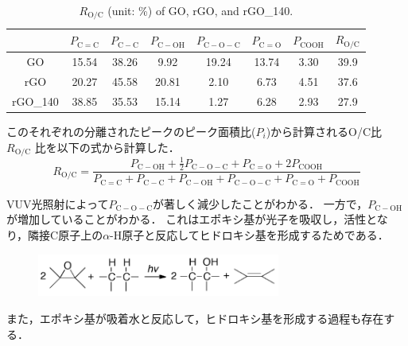 \documentclass[platex,dvipdfmx]{jlreq}			%
\begin{document}
\begin{table}[H]
    \centering
    \caption{$R_{\mathrm{O/C}}$ (unit: \%) of GO, rGO, and rGO\_140.}
    \label{tab:hogehoge}
    \begin{tabular}{|c|c|c|c|c|c|c|c|}
        \hline
        ~        & $P_{\mathrm{C=C}}$ & $P_{\mathrm{C-C}}$ & $P_{\mathrm{C-OH}}$ & $P_{\mathrm{C-O-C}}$ & $P_{\mathrm{C=O}}$ & $P_{\mathrm{COOH}}$ & $R_{\mathrm{O/C}}$ \\ \hline
        GO       & 15.54              & 38.26              & 9.92                & 19.24                & 13.74              & 3.30                & 39.9 \\ \hline
        rGO      & 20.27              & 45.58              & 20.81               & 2.10                 & 6.73               & 4.51                & 37.6 \\ \hline
        rGO\_140 & 38.85              & 35.53              & 15.14               & 1.27                 & 6.28               & 2.93                & 27.9 \\ \hline
    \end{tabular}
\end{table}
  

このそれぞれの分離されたピークのピーク面積比($P_i$)から計算されるO/C比 $R_{\mathrm{O/C}}$ 比を以下の式から計算した．
\begin{displaymath}
    R_{\mathrm{O/C}} = \frac{P_{\mathrm{C-OH}} + \frac{1}{2}P_{\mathrm{C-O-C}} + P_{\mathrm{C=O}} + 2P_{\mathrm{COOH}}}{P_{\mathrm{C=C}} + P_{\mathrm{C-C}} + P_{\mathrm{C-OH}} + P_{\mathrm{C-O-C}} + P_{\mathrm{C=O}} + P_{\mathrm{COOH}}}
\end{displaymath}

VUV光照射によって$P_{\mathrm{C-O-C}}$が著しく減少したことがわかる．
一方で，$P_{\mathrm{C-OH}}$が増加していることがわかる．
これはエポキシ基が光子を吸収し，活性となり，隣接C原子上の$\alpha$-H原子と反応してヒドロキシ基を形成するためである．

\begin{figure}
    \centering
    \includegraphics[width=80mm]{figures/fig_equation1.png}
    \label{fig:equation1}
\end{figure}

また，エポキシ基が吸着水と反応して，ヒドロキシ基を形成する過程も存在する．
\end{document}
